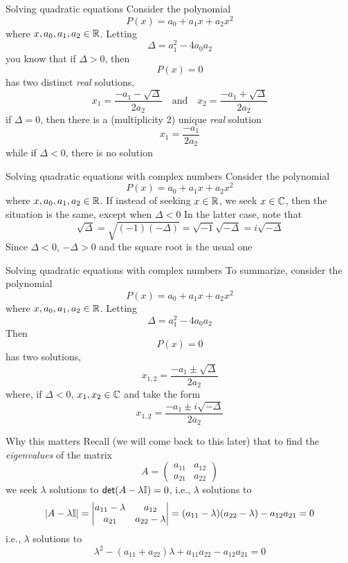 \documentclass[aspectratio=169]{beamer}
\begin{document}
\begin{frame}{Solving quadratic equations}
Consider the polynomial
\[
P(x)=a_0+a_1x+a_2x^2
\]
where $x,a_0,a_1,a_2\in\mathbb{R}$. Letting
\[
\Delta = a_1^2-4a_0a_2
\]
you know that if $\Delta>0$, then 
\[
P(x)=0
\]
has two distinct \emph{real} solutions, 
\[
x_1=\frac{-a_1-\sqrt{\Delta}}{2a_2}
\quad\textrm{and}\quad
x_2=\frac{-a_1+\sqrt{\Delta}}{2a_2}
\]
if $\Delta=0$, then there is a (multiplicity 2) unique \emph{real} solution
\[
x_{1}=\frac{-a_1}{2a_2}
\]
while if $\Delta<0$, there is no solution
\end{frame}


\begin{frame}{Solving quadratic equations with complex numbers}
	Consider the polynomial
	\[
	P(x)=a_0+a_1x+a_2x^2
	\]
	where $x,a_0,a_1,a_2\in\mathbb{R}$. If instead of seeking $x\in\mathbb{R}$, we seek $x\in\mathbb{C}$, then the situation is the same, except when $\Delta<0$
	\vfill
	In the latter case, note that
	\[
	\sqrt{\Delta} 
	= \sqrt{(-1)(-\Delta)} 
	= \sqrt{-1}\sqrt{-\Delta}
	= i\sqrt{-\Delta}
	\]
	\vfill
	Since $\Delta<0$, $-\Delta>0$ and the square root is the usual one
\end{frame}

\begin{frame}{Solving quadratic equations with complex numbers}
	To summarize, consider the polynomial
	\[
	P(x)=a_0+a_1x+a_2x^2
	\]
	where $x,a_0,a_1,a_2\in\mathbb{R}$. Letting
	\[
	\Delta = a_1^2-4a_0a_2
	\]
	\vfill
	Then 
	\[
	P(x)=0
	\]
	has two solutions, 
	\[
	x_{1,2} = \frac{-a_1\pm\sqrt{\Delta}}{2a_2}
	\]
	where, if $\Delta<0$, $x_1,x_2\in\mathbb{C}$ and take the form
	\[
	x_{1,2} = \frac{-a_1\pm i\sqrt{-\Delta}}{2a_2}
	\]
\end{frame}

\begin{frame}{Why this matters}
Recall (we will come back to this later) that to find the \emph{eigenvalues} of the matrix
\[
A=
\begin{pmatrix}
a_{11} & a_{12} \\ a_{21} & a_{22}
\end{pmatrix}
\]
we seek $\lambda$ solutions to $\mathsf{det}(A-\lambda\mathbb{I})=0$, i.e., $\lambda$ solutions to
\[
|A-\lambda\mathbb{I}|
=\left|
\begin{matrix}
a_{11}-\lambda & a_{12} \\ a_{21} & a_{22}-\lambda
\end{matrix}
\right|
=(a_{11}-\lambda)(a_{22}-\lambda)-a_{12}a_{21}=0
\]
i.e., $\lambda$ solutions to
\[
\lambda^2 - (a_{11}+a_{22})\lambda + a_{11}a_{22}-a_{12}a_{21} = 0
\]
\end{frame}
\end{document}
